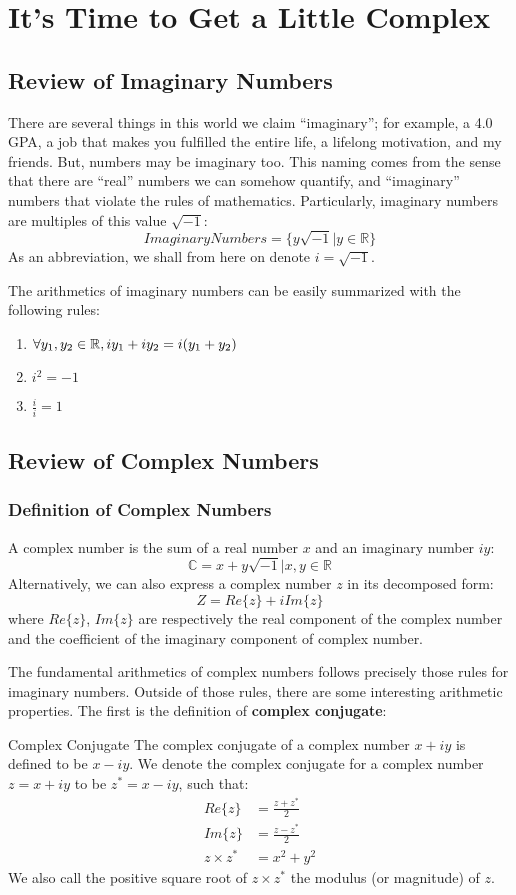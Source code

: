\chapter{It's Time to Get a Little Complex}

\section{Review of Imaginary Numbers}
There are several things in this world we claim ``imaginary''; for example, a 4.0 GPA, a job that makes you fulfilled the entire life, a lifelong motivation, and my friends.
But, numbers may be imaginary too. This naming comes from the sense that there are ``real'' numbers we can somehow quantify, and ``imaginary'' numbers that violate the rules of mathematics.
Particularly, imaginary numbers are multiples of this value $\sqrt{-1}$:
\[
    ImaginaryNumbers = \{y \sqrt{-1} | y \in \mathbb{R}\}
\]
As an abbreviation, we shall from here on denote $i = \sqrt{-1}$.

The arithmetics of imaginary numbers can be easily summarized with the following rules:
\begin{enumerate}
    \item $\forall y_1, y_2 \in \mathbb{R}, i y_1 + i y_2 = i (y_1 + y_2)$
    \item $i ^ 2 = -1$
    \item $\frac{i}{i} = 1$
\end{enumerate}

\section{Review of Complex Numbers}
\subsection{Definition of Complex Numbers}
A complex number is the sum of a real number $x$ and an imaginary number $iy$:
\[
    \mathbb{C} = {x + y\sqrt{-1}| x, y \in \mathbb{R}}
\]
Alternatively, we can also express a complex number $z$ in its decomposed form:
\[
    Z = Re\{z\} + i Im\{z\}
\]
where $Re\{z\}$, $Im\{z\}$ are respectively the real component of the complex number and the coefficient of the imaginary component of complex number.

The fundamental arithmetics of complex numbers follows precisely those rules for imaginary numbers.
Outside of those rules, there are some interesting arithmetic properties.
The first is the definition of \textbf{complex conjugate}:
\begin{ln-define}{Complex Conjugate}{}
    The complex conjugate of a complex number $x + iy$ is defined to be $x - iy$.
    We denote the complex conjugate for a complex number $z = x + iy$ to be $z^* = x - iy$, such that:
    \begin{align*}
        Re\{z\} &= \frac{z + z^*}{2} \\
        Im\{z\} &= \frac{z - z^*}{2} \\
        z \times z^* &= x^2 + y^2
    \end{align*}
    We also call the positive square root of $z \times z^*$ the modulus (or magnitude) of $z$.
\end{ln-define}

